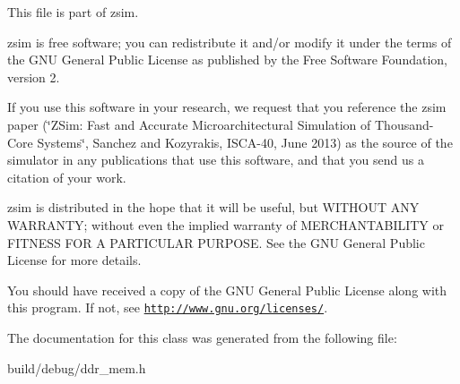 This file is part of zsim.

zsim is free software; you can redistribute it and/or modify it under the terms of the G\-N\-U General Public License as published by the Free Software Foundation, version 2.

If you use this software in your research, we request that you reference the zsim paper (\char`\"{}\-Z\-Sim\-: Fast and Accurate Microarchitectural Simulation of
\-Thousand-\/\-Core Systems\char`\"{}, Sanchez and Kozyrakis, I\-S\-C\-A-\/40, June 2013) as the source of the simulator in any publications that use this software, and that you send us a citation of your work.

zsim is distributed in the hope that it will be useful, but W\-I\-T\-H\-O\-U\-T A\-N\-Y W\-A\-R\-R\-A\-N\-T\-Y; without even the implied warranty of M\-E\-R\-C\-H\-A\-N\-T\-A\-B\-I\-L\-I\-T\-Y or F\-I\-T\-N\-E\-S\-S F\-O\-R A P\-A\-R\-T\-I\-C\-U\-L\-A\-R P\-U\-R\-P\-O\-S\-E. See the G\-N\-U General Public License for more details.

You should have received a copy of the G\-N\-U General Public License along with this program. If not, see \href{http://www.gnu.org/licenses/}{\tt http\-://www.\-gnu.\-org/licenses/}. 

The documentation for this class was generated from the following file\-:\begin{DoxyCompactItemize}
\item 
build/debug/ddr\-\_\-mem.\-h\end{DoxyCompactItemize}
